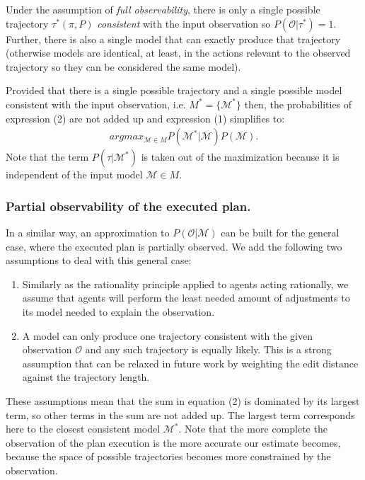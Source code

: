\documentclass[letterpaper]{article} %
\begin{document}
Under the assumption of {\em full observability}, there is only a single possible trajectory $\tau^*(\pi,P)$ {\em consistent} with the input observation so $P(\mathcal{O}|\tau^*)=1$. Further, there is also a single model that can exactly produce that trajectory (otherwise models are identical, at least, in the actions relevant to the observed trajectory so they can be considered the same model).

Provided that there is a single possible trajectory and a single possible model consistent with the input observation, i.e. $M^*=\{\mathcal{M}^*\}$ then, the probabilities of expression (2) are not added up and expression (1) simplifies to:
\begin{align}
argmax_{\mathcal{M}\in M} P(\mathcal{M^*}|\mathcal{M}) P(\mathcal{M}).
\end{align}
Note that the term $P(\tau|\mathcal{M^*})$ is taken out of the maximization because it is independent of the input model $\mathcal{M}\in M$.

\subsubsection{Partial observability of the executed plan.} In a similar way, an approximation to $P(\mathcal{O}|\mathcal{M})$ can be built for the general case, where the executed plan is partially observed. We add the following two assumptions to deal with this general case:

\begin{enumerate}
\item Similarly as the rationality principle \cite{Dennett83} applied to agents acting rationally, we assume that agents will perform the least needed amount of adjustments to its model needed to explain the observation.
\item A model can only produce one trajectory consistent with the given observation $\mathcal{O}$ and any such trajectory is equally likely. This is a strong assumption that can be relaxed in future work by weighting the edit distance against the trajectory length.
\end{enumerate}

These assumptions mean that the sum in equation (2) is dominated by its largest term, so other terms in the sum are not added up. The largest term corresponds here to the closest consistent model $\mathcal{M^*}$. Note that the more complete the observation of the plan execution
is the more accurate our estimate becomes, because the space of possible trajectories becomes more constrained by the observation.
\end{document}
